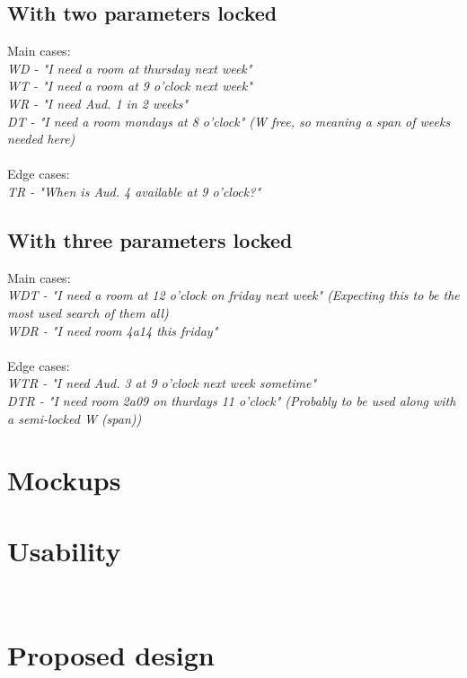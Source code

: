 \subsection*{With two parameters locked}
Main cases: \\ \emph{
WD - "I need a room at thursday next week" \\
WT - "I need a room at 9 o'clock next week" \\
WR - "I need Aud. 1 in 2 weeks" \\
DT - "I need a room mondays at 8 o'clock" (W free, so meaning a span of weeks needed here) \\
}\\
\noindent Edge cases: \\ \emph{
TR - "When is Aud. 4 available at 9 o'clock?" \\
}
\subsection*{With three parameters locked}
Main cases: \\ \emph{
WDT - "I need a room at 12 o'clock on friday next week" (Expecting this to be the most used search of them all) \\
WDR - "I need room 4a14 this friday" \\
}\\
\noindent Edge cases: \\ \emph{
WTR - "I need Aud. 3 at 9 o'clock next week sometime" \\
DTR - "I need room 2a09 on thurdays 11 o'clock" (Probably to be used along with a semi-locked W (span)) \\
}

\section{Mockups}

\section{Usability}
\\


\section{Proposed design}
